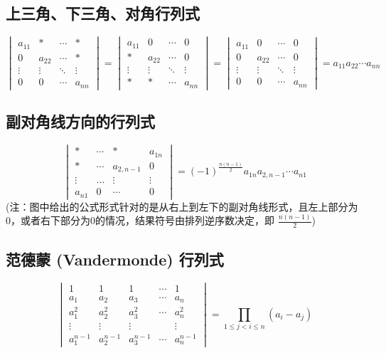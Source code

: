 \documentclass[UTF8]{ctexart}
\theoremstyle{mydef}
\begin{document}
\subsection{上三角、下三角、对角行列式}
$$
\begin{vmatrix}
a_{11} & * & \cdots & * \\
0 & a_{22} & \cdots & * \\
\vdots & \vdots & \ddots & \vdots \\
0 & 0 & \cdots & a_{nn}
\end{vmatrix}
=
\begin{vmatrix}
a_{11} & 0 & \cdots & 0 \\
* & a_{22} & \cdots & 0 \\
\vdots & \vdots & \ddots & \vdots \\
* & * & \cdots & a_{nn}
\end{vmatrix}
=
\begin{vmatrix}
a_{11} & 0 & \cdots & 0 \\
0 & a_{22} & \cdots & 0 \\
\vdots & \vdots & \ddots & \vdots \\
0 & 0 & \cdots & a_{nn}
\end{vmatrix}
= a_{11} a_{22} \cdots a_{nn}
$$

\subsection{副对角线方向的行列式}
$$
\begin{vmatrix}
* & \cdots & * & a_{1n} \\
* & \cdots & a_{2, n-1} & 0 \\
\vdots & \dots & \vdots & \vdots \\
a_{n1} & 0 & \cdots & 0
\end{vmatrix}
= (-1)^{\frac{n(n-1)}{2}} a_{1n} a_{2, n-1} \cdots a_{n1}
$$
(注：图中给出的公式形式针对的是从右上到左下的副对角线形式，且左上部分为0，或者右下部分为0的情况，结果符号由排列逆序数决定，即 $\frac{n(n-1)}{2}$)

\subsection{范德蒙 (Vandermonde) 行列式}
$$
\begin{vmatrix}
1 & 1 & 1 & \cdots & 1 \\
a_1 & a_2 & a_3 & \cdots & a_n \\
a_1^2 & a_2^2 & a_3^2 & \cdots & a_n^2 \\
\vdots & \vdots & \vdots & & \vdots \\
a_1^{n-1} & a_2^{n-1} & a_3^{n-1} & \cdots & a_n^{n-1}
\end{vmatrix}
= \prod_{1 \le j < i \le n} (a_i - a_j)
$$
\end{document}
